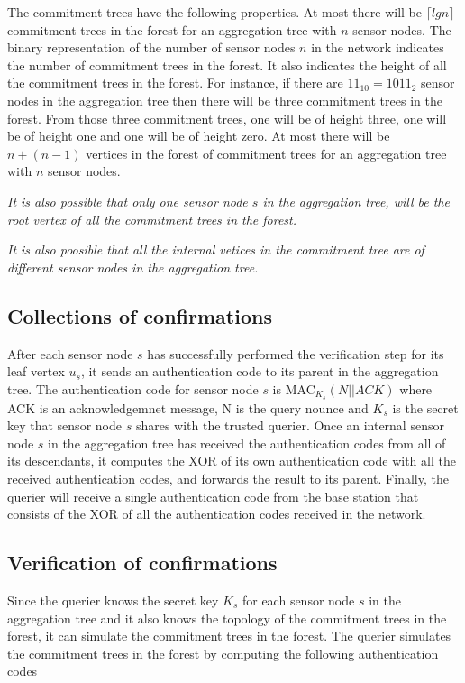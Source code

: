 	The commitment trees have the following properties. 
	At most there will be $\lceil lg  n \rceil$ commitment trees in the forest for an aggregation tree with $n$ sensor nodes.
	The binary representation of the number of sensor nodes $n$ in the network indicates the number of commitment trees in the forest. It also indicates the height of all the commitment trees in the forest. 
	For instance, if there are $ 11_{10} = 1011_{2} $ sensor nodes in the aggregation tree then there will be three commitment trees in the forest. From those three commitment trees, one will be of height three, one will be of height one and one will be of height zero.
	At most there will be $n + ( n - 1 )$ vertices in the forest of commitment trees for an aggregation tree with $n$ sensor 
	nodes.

	\textit{It is also possible that only one sensor node $s$ in the aggregation tree, will be the root vertex of all the commitment trees in the forest.} 

	\textit{It is also poosible that all the internal vetices in the commitment tree are of different sensor nodes in the aggregation tree.}



\subsection{Collections of confirmations}
After each sensor node $s$ has successfully performed the 
verification step for its leaf vertex $u_{s}$, it sends an 
authentication code to its parent in the aggregation tree.
The authentication code for sensor node $s$ is MAC$_{K_{s}}(N||ACK)$
where ACK is an acknowledgemnet message, N is the query nounce and $K_{s}$ 
is the secret key that sensor node $s$ shares with the trusted querier. Once
an internal sensor node $s$ in the aggregation tree has received the
authentication codes from all of its descendants, it computes the XOR of its 
own authentication code with all the received authentication codes, and 
forwards the result to its parent. Finally, the querier will receive a 
single authentication code from the base station that consists of the XOR of 
all the authentication codes received in the network. 

\subsection{Verification of confirmations}
Since the querier knows the secret key $K_{s}$ for each sensor node $s$ in the aggregation tree and it also knows the topology of the commitment trees in the forest, it can simulate the commitment trees in the forest. The querier simulates the commitment trees in the forest by computing the following authentication codes\\

